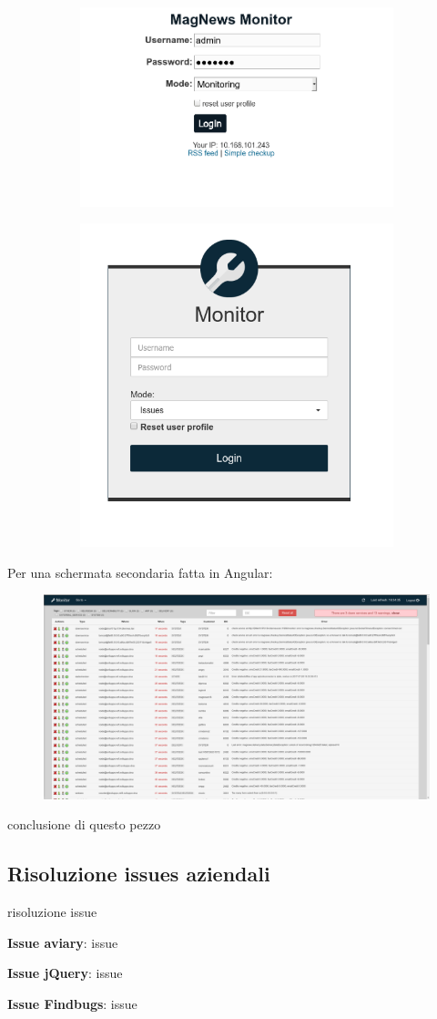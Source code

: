 \documentclass[a4paper]{article}
\begin{document}
\begin{figure}[H]
	\centering
	\begin{subfigure}
	  \centering
	  \includegraphics[width=0.45\linewidth]{login_old.png}
	\end{subfigure}%
	\begin{subfigure}
	  \centering
	  \includegraphics[width=0.45\linewidth]{login_new.png}
	\end{subfigure}
\end{figure}
Per una schermata secondaria fatta in Angular:
\begin{figure}[H]
	\includegraphics[width=\textwidth]{issue_new.png}
	\centering
\end{figure}
conclusione di questo pezzo
\subsection{Risoluzione issues aziendali}
\par risoluzione issue\\
\par \textbf{Issue aviary}: issue\\
\par \textbf{Issue jQuery}: issue\\
\par \textbf{Issue Findbugs}: issue\\
\end{document}
